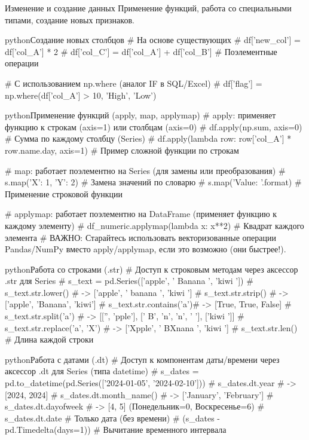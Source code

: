 \begin{textbox}{Изменение и создание данных}
Применение функций, работа со специальными типами, создание новых признаков.

\begin{codebox}{python}{Создание новых столбцов}
# На основе существующих
# df['new_col'] = df['col_A'] * 2
# df['col_C'] = df['col_A'] + df['col_B'] # Поэлементные операции

# С использованием np.where (аналог IF в SQL/Excel)
# df['flag'] = np.where(df['col_A'] > 10, 'High', 'Low')
\end{codebox}

\begin{codebox}{python}{Применение функций (apply, map, applymap)}
# apply: применяет функцию к строкам (axis=1) или столбцам (axis=0)
# df.apply(np.sum, axis=0) # Сумма по каждому столбцу (Series)
# df.apply(lambda row: row['col_A'] * row.name.day, axis=1) # Пример сложной функции по строкам

# map: работает поэлементно на Series (для замены или преобразования)
# s.map({'X': 1, 'Y': 2}) # Замена значений по словарю
# s.map('Value: {}'.format) # Применение строковой функции

# applymap: работает поэлементно на DataFrame (применяет функцию к каждому элементу)
# df_numeric.applymap(lambda x: x**2) # Квадрат каждого элемента
# ВАЖНО: Старайтесь использовать векторизованные операции Pandas/NumPy вместо apply/applymap, если это возможно (они быстрее!).
\end{codebox}

\begin{codebox}{python}{Работа со строками (.str)}
# Доступ к строковым методам через аксессор .str для Series
# s_text = pd.Series(['apple', ' Banana ', 'kiwi '])
# s_text.str.lower()      # -> ['apple', ' banana ', 'kiwi ']
# s_text.str.strip()      # -> ['apple', 'Banana', 'kiwi']
# s_text.str.contains('a')# -> [True, True, False]
# s_text.str.split('a')   # -> [['', 'pple'], [' B', 'n', 'n', ' '], ['kiwi ']]
# s_text.str.replace('a', 'X') # -> ['Xpple', ' BXnana ', 'kiwi ']
# s_text.str.len()        # Длина каждой строки
\end{codebox}

\begin{codebox}{python}{Работа с датами (.dt)}
# Доступ к компонентам даты/времени через аксессор .dt для Series (типа datetime)
# s_dates = pd.to_datetime(pd.Series(['2024-01-05', '2024-02-10']))
# s_dates.dt.year         # -> [2024, 2024]
# s_dates.dt.month_name() # -> ['January', 'February']
# s_dates.dt.dayofweek    # -> [4, 5] (Понедельник=0, Воскресенье=6)
# s_dates.dt.date         # Только дата (без времени)
# (s_dates - pd.Timedelta(days=1)) # Вычитание временного интервала
\end{codebox}
\end{textbox}

